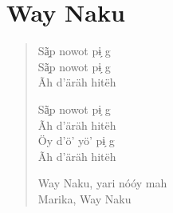\chapter{Way Naku}

\begin{verse}
Sã̗p nowot pɨ̗ g\\
Sã̗p nowot pɨ̗ g\\
Ãh d’äräh hitëh

Sã̗p nowot pɨ̗ g\\
Ãh d’äräh hitëh\\
Öy d’ö’ yö’ pɨ̗ g\\
Ãh d’äräh hitëh

Way Naku, yari nóóy mah\\
Marika, Way Naku
\end{verse}


